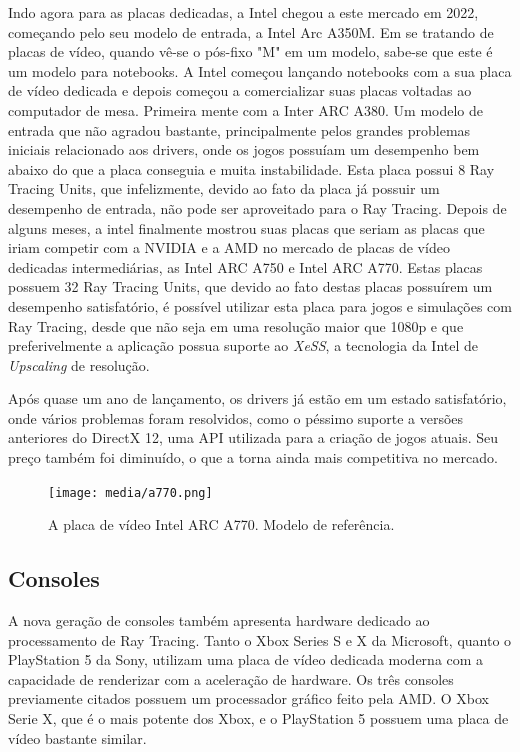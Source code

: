 \documentclass[journal]{IEEEtran}
\begin{document}
Indo agora para as placas dedicadas, a Intel chegou a este mercado em 2022, começando pelo
seu modelo de entrada, a Intel Arc A350M. Em se tratando de placas de vídeo, quando vê-se o
pós-fixo "M" em um modelo, sabe-se que este é um modelo para notebooks. A Intel começou lançando
notebooks com a sua placa de vídeo dedicada e depois começou a comercializar suas placas
voltadas ao computador de mesa. Primeira mente com a Inter ARC A380. Um modelo de entrada que
não agradou bastante, principalmente pelos grandes problemas iniciais relacionado aos drivers,
onde os jogos possuíam um desempenho bem abaixo do que a placa conseguia e muita instabilidade.
Esta placa possui 8 Ray Tracing Units, que infelizmente, devido ao fato da placa já possuir
um desempenho de entrada, não pode ser aproveitado para o Ray Tracing. Depois de alguns meses,
a intel finalmente mostrou suas placas que seriam as placas que iriam competir com a NVIDIA e
a AMD no mercado de placas de vídeo dedicadas intermediárias, as Intel ARC A750 e Intel ARC
A770. Estas placas possuem 32 Ray Tracing Units, que devido ao fato destas placas possuírem
um desempenho satisfatório, é possível utilizar esta placa para jogos e simulações com Ray 
Tracing, desde que não seja em uma resolução maior que 1080p e que preferivelmente a aplicação
possua suporte ao \emph{XeSS}, a tecnologia da Intel de \emph{Upscaling} de resolução.

Após quase um ano de lançamento, os drivers já estão em um estado satisfatório, onde vários
problemas foram resolvidos, como o péssimo suporte a versões anteriores do DirectX 12, uma
API utilizada para a criação de jogos atuais. Seu preço também foi diminuído, o que a torna
ainda mais competitiva no mercado.

\begin{figure}[h]
  \centering
  \texttt{[image: media/a770.png]}
  \caption{A placa de vídeo Intel ARC A770. Modelo de referência.}
  \label{img_a440}
\end{figure}


\subsection{Consoles}
A nova geração de consoles também apresenta hardware dedicado ao processamento de Ray Tracing.
Tanto o Xbox Series S e X da Microsoft, quanto o PlayStation 5 da Sony, utilizam uma placa de
vídeo dedicada moderna com a capacidade de renderizar com a aceleração de hardware. Os três 
consoles previamente citados possuem um processador gráfico feito pela AMD. O Xbox Serie X,
que é o mais potente dos Xbox, e o PlayStation 5 possuem uma placa de vídeo bastante similar.
\end{document}
